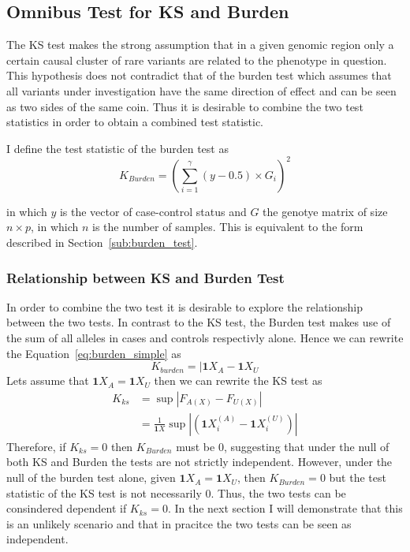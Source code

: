 \subsection{Omnibus Test for KS and Burden}
\label{sub:omnibus_test_for_ks_and_burden}

The KS test makes the strong assumption that in a given genomic region only a certain causal cluster of rare variants are related to the phenotype in question.
This hypothesis does not contradict that of the burden test which assumes that all variants under investigation have the same direction of effect and can be seen as two sides of the same coin.
Thus it is desirable to combine the two test statistics in order to obtain a combined test statistic.

I define the test statistic of the burden test as 
\begin{equation}\label{eq:burden_simple}
  K_{Burden} = {(\sum^\gamma_{i=1} (y-0.5) \times G_i)}^2
\end{equation}

in which $y$ is the vector of case-control status and $G$ the genotye matrix of size $n \times p$, in which $n$ is the number of samples.
This is equivalent to the form described in Section~\ref{sub:burden_test}.

\subsubsection{Relationship between KS and Burden Test}
\label{ssub:Relationship_between_KS_and_Burden_Test}

In order to combine the two test it is desirable to explore the relationship between the two tests.
In contrast to the KS test, the Burden test makes use of the sum of all alleles in cases and controls respectivly alone.
Hence we can rewrite the Equation~\ref{eq:burden_simple} as
\begin{equation}
  K_{burden} =  |\pmb{1}X_{A}  - \pmb{1}X_{U}
\end{equation}
Lets assume that $\pmb{1}X_{A} = \pmb{1}X_{U}$ then we can rewrite the KS test as
\begin{equation}
  \begin{aligned}
    K_{ks} & = \sup |F_{A(X)} - F_{U(X)}|  \\
           & = \frac{1}{\pmb{1}X} \sup |(\pmb{1}X^{(A)}_i - \pmb{1}X^{(U)}_i)|
  \end{aligned}
\end{equation}
Therefore, if $K_{ks}=0$ then $K_{Burden}$ must be $0$, suggesting that under the null of both KS and Burden the tests are not strictly independent.
However, under the null of the burden test alone, given $\pmb{1}X_{A} = \pmb{1}X_{U}$, then $K_{Burden} = 0$ but the test statistic of the KS test is not necessarily $0$.
Thus, the two tests can be consindered dependent if $K_{ks} = 0$.
In the next section I will demonstrate that this is an unlikely scenario and that in pracitce the two tests can be seen as independent.

